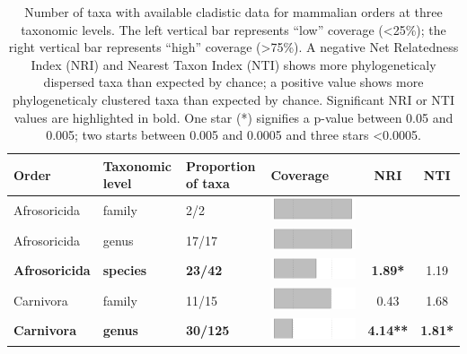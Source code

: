 \begin{longtable}{lL{1.8cm}C{2cm}lcc}
\caption[Number of taxa with available cladistic data for mammalian orders]{Number of taxa with available cladistic data for mammalian orders at three taxonomic levels. The left vertical bar represents ``low'' coverage (\textless 25\%); the right vertical bar represents ``high'' coverage (\textgreater 75\%). A negative Net Relatedness Index (NRI) and Nearest Taxon Index (NTI) shows more phylogeneticaly dispersed taxa than expected by chance; a positive value shows more phylogeneticaly clustered taxa than expected by chance. Significant NRI or NTI values are highlighted in bold. One star (*) signifies a p-value between 0.05 and 0.005; two starts between 0.005 and 0.0005 and three stars \textless 0.0005.} \\ 
  \hline
Order & Taxonomic level & Proportion of taxa & Coverage & NRI & NTI \\ 
  \hline
Afrosoricida & family & 2/2 & \includegraphics[width=0.20\linewidth, height=0.05\linewidth]{Missing_mammals/Table_figures/bar1.pdf} &   &   \\ 
  Afrosoricida & genus & 17/17 & \includegraphics[width=0.20\linewidth, height=0.05\linewidth]{Missing_mammals/Table_figures/bar2.pdf} &   &   \\ 
  \textbf{Afrosoricida} & \textbf{species} & \textbf{23/42} & \includegraphics[width=0.20\linewidth, height=0.05\linewidth]{Missing_mammals/Table_figures/bar3.pdf} & \textbf{1.89*} & 1.19 \\ 
  Carnivora & family & 11/15 & \includegraphics[width=0.20\linewidth, height=0.05\linewidth]{Missing_mammals/Table_figures/bar4.pdf} & 0.43 & 1.68 \\ 
  \textbf{Carnivora} & \textbf{genus} & \textbf{30/125} & \includegraphics[width=0.20\linewidth, height=0.05\linewidth]{Missing_mammals/Table_figures/bar5.pdf} & \textbf{4.14**} & \textbf{1.81*} \\ 

\end{longtable}
